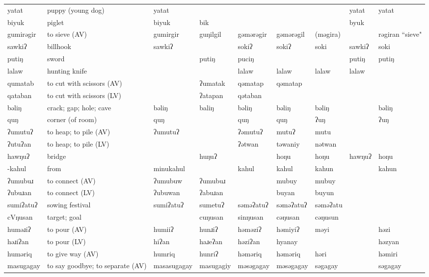 \begin{landscape}
\begin{longtable}{*{9}{>{\raggedright\arraybackslash}p{}}}
\text{*}yatat & puppy (young dog) & yatat &  &  &  &  & yatat & yatat\\
\text{*}biyuk & piglet & biyuk & bik &  &  &  & byuk & \\
\text{*}gumirəgir & to sieve (AV) & gumirgir & guŋilgil & gəmərəgir & gəmərəgil & (məgira) &  & rəgiran ``sieve"\\
\text{*}sawkiʔ & billhook & sawkiʔ &  & sokiʔ & sokiʔ & soki & sawkiʔ & soki\\
\text{*}putiŋ & sword &  & putiŋ & puciŋ &  &  & putiŋ & putiŋ\\
\text{*}lalaw & hunting knife &  &  & lalaw & lalaw & lalaw & lalaw & \\
\text{*}qumatab & to cut with scissors (AV) &  & ʔumatak & qəmatap & qəmatap &  &  & \\
\text{*}qataban & to cut with scissors (LV) &  & ʔatapan & qətaban &  &  &  & \\
\text{*}bəliŋ & crack; gap; hole; cave & bəliŋ & baliŋ & bəliŋ & bəliŋ & bəliŋ &  & bəliŋ\\
\text{*}quŋ & corner (of room) & quŋ &  & quŋ & quŋ & ʔuŋ &  & ʔuŋ\\
\text{*}ʔumutuʔ & to heap; to pile (AV) & ʔumutuʔ &  & ʔəmutuʔ & mutuʔ & mutu &  & \\
\text{*}ʔutuʔan & to heap; to pile (LV) &  &  & ʔətwan & təwaniy & nətwan &  & \\
\text{*}hawŋuʔ & bridge &  & huŋuʔ &  & hoŋu & hoŋu & hawŋuʔ & hoŋu\\
\text{*}-kahul & from & minukahul &  & kahul & kahul & kahun &  & kahun\\
\text{*}ʔumubuɹ & to connect (AV) & ʔumubuw & ʔumubuɹ &  & mubuy & mubuy &  & \\
\text{*}ʔubuɹan & to connect (LV) & ʔubuwan & ʔabuɹan &  & buyan & buyun &  & \\
\text{*}sumiʔatuʔ & sowing festival & sumiʔatuʔ & sumetuʔ & səməʔatuʔ & səməʔatuʔ & səməʔatu &  & \\
\text{*}cVŋusan & target; goal &  & cuŋusan & sinŋusan & cəŋusan & cəŋusun &  & \\
\text{*}huməɹiʔ & to pour (AV) & humiiʔ & hunɹiʔ & həməziʔ & həmiyiʔ & məyi &  & həzi\\
\text{*}həɹiʔan & to pour (LV) & hiʔan & haɹeʔan & həziʔan & hyanay &  &  & həzyan\\
\text{*}huməriq & to give way (AV) & humriq & hunriʔ & həməriq & həməriq & həri &  & həmiri\\
\text{*}masugagay & to say goodbye; to separate (AV) & masasugagay & masugagiy & məsəgagay & məsəgagay & səgagay &  & səgagay\\

\end{longtable}
\end{landscape}
